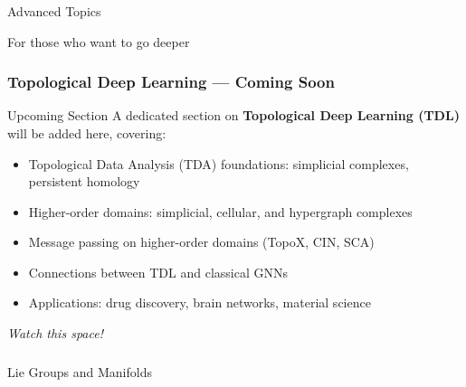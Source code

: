 \begin{frame}[fragile]\frametitle{}
\begin{center}
{\Large Advanced Topics}

\vspace{0.3cm}
{\small For those who want to go deeper}
\end{center}
\end{frame}

\begin{frame}[fragile]\frametitle{Topological Deep Learning --- Coming Soon}
  \begin{block}{Upcoming Section}
    A dedicated section on \textbf{Topological Deep Learning (TDL)} will be added here, covering:
    \begin{itemize}
      \item Topological Data Analysis (TDA) foundations: simplicial complexes, persistent homology
      \item Higher-order domains: simplicial, cellular, and hypergraph complexes
      \item Message passing on higher-order domains (TopoX, CIN, SCA)
      \item Connections between TDL and classical GNNs
      \item Applications: drug discovery, brain networks, material science
    \end{itemize}
  \end{block}
  \vspace{0.3cm}
  {\em Watch this space!}
\end{frame}

\begin{frame}[fragile]\frametitle{}
\begin{center}
{\Large Lie Groups and Manifolds}
\end{center}
\end{frame}


